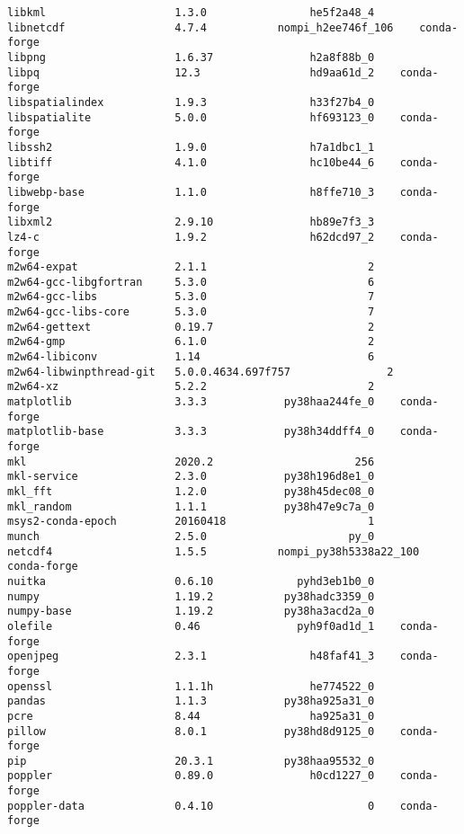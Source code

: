 \begin{Verbatim}
libkml                    1.3.0                he5f2a48_4
libnetcdf                 4.7.4           nompi_h2ee746f_106    conda-forge
libpng                    1.6.37               h2a8f88b_0
libpq                     12.3                 hd9aa61d_2    conda-forge
libspatialindex           1.9.3                h33f27b4_0
libspatialite             5.0.0                hf693123_0    conda-forge
libssh2                   1.9.0                h7a1dbc1_1
libtiff                   4.1.0                hc10be44_6    conda-forge
libwebp-base              1.1.0                h8ffe710_3    conda-forge
libxml2                   2.9.10               hb89e7f3_3
lz4-c                     1.9.2                h62dcd97_2    conda-forge
m2w64-expat               2.1.1                         2
m2w64-gcc-libgfortran     5.3.0                         6
m2w64-gcc-libs            5.3.0                         7
m2w64-gcc-libs-core       5.3.0                         7
m2w64-gettext             0.19.7                        2
m2w64-gmp                 6.1.0                         2
m2w64-libiconv            1.14                          6
m2w64-libwinpthread-git   5.0.0.4634.697f757               2
m2w64-xz                  5.2.2                         2
matplotlib                3.3.3            py38haa244fe_0    conda-forge
matplotlib-base           3.3.3            py38h34ddff4_0    conda-forge
mkl                       2020.2                      256
mkl-service               2.3.0            py38h196d8e1_0
mkl_fft                   1.2.0            py38h45dec08_0
mkl_random                1.1.1            py38h47e9c7a_0
msys2-conda-epoch         20160418                      1
munch                     2.5.0                      py_0
netcdf4                   1.5.5           nompi_py38h5338a22_100    conda-forge
nuitka                    0.6.10             pyhd3eb1b0_0
numpy                     1.19.2           py38hadc3359_0
numpy-base                1.19.2           py38ha3acd2a_0
olefile                   0.46               pyh9f0ad1d_1    conda-forge
openjpeg                  2.3.1                h48faf41_3    conda-forge
openssl                   1.1.1h               he774522_0
pandas                    1.1.3            py38ha925a31_0
pcre                      8.44                 ha925a31_0
pillow                    8.0.1            py38hd8d9125_0    conda-forge
pip                       20.3.1           py38haa95532_0
poppler                   0.89.0               h0cd1227_0    conda-forge
poppler-data              0.4.10                        0    conda-forge

\end{Verbatim}

